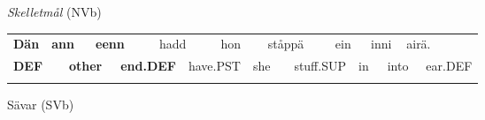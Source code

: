 \begin{styleExLtrTblii}
\textit{Skelletmål} (NVb)

\end{styleExLtrTblii}

\begin{tabular}{llllllllllllllllll}
\lsptoprule
{\bfseries Dän} & \multicolumn{2}{l}{{\bfseries ann}

} & \multicolumn{2}{l}{{\bfseries eenn}

} & \multicolumn{2}{l}{hadd

} & \multicolumn{2}{l}{hon

} & \multicolumn{2}{l}{ståppä

} & \multicolumn{2}{l}{ein

} & \multicolumn{2}{l}{inni

} & \multicolumn{2}{l}{airä.

} & \\
\multicolumn{2}{l}{{\bfseries DEF}

} & \multicolumn{2}{l}{{\bfseries other}

} & \multicolumn{2}{l}{{\bfseries end.DEF}

} & \multicolumn{2}{l}{have.PST

} & \multicolumn{2}{l}{she

} & \multicolumn{2}{l}{stuff.SUP

} & \multicolumn{2}{l}{in

} & \multicolumn{2}{l}{into

} & \multicolumn{2}{l}{ear.DEF

}\\
\lspbottomrule
\end{tabular}

\begin{styleExLtrTblii}
Sävar (SVb)

\end{styleExLtrTblii}

